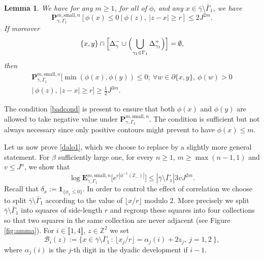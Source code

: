 \documentclass[JEP,XML,SOM,Unicode, NoFloatCountersInSection]{cedram}
\let\mathcal\mathscr
\newcommand{\sep}{\,:\,}
\numberwithin{equation}{section}
\theoremstyle{plain}
\newtheorem{lemma}[theorem]{Lemma}
\theoremstyle{definition}
\newcommand{\sm}{\mathrm{small}}
\newcommand{\lint}{\llbracket}
\newcommand{\rint}{\rrbracket}
\newcommand{\ind}{\mathbf{1}}
\newcommand{\cB}{{\ensuremath{\mathcal B}} }
\newcommand{\bP}{{\ensuremath{\mathbf P}} }
\newcommand{\bE}{{\ensuremath{\mathbf E}} }
\newcommand{\bbZ}{{\ensuremath{\mathbb Z}} }
\newcommand{\gb}{\beta}
\newcommand{\gG}{\Gamma}
\begin{document}
\begin{lemma}\label{locall}
We have for any $m\ge 1$, for all of $\phi$, and any $x\in\bar \gamma \setminus \bar \gG_1$, we have\vspace*{-3pt}
\begin{equation*}%
\bP^{m,\sm,n}_{\gamma,\gG_1}[\phi(x)\le 0\ | \ \phi(z),\ |z-x|\ge r]\le 2 J^{2m}.
\end{equation*}
If moreover\vspace*{-3pt}
\begin{equation}\label{badcond}
\{x,y\}\cap \Bigl[\Delta^-_{\gamma}\cup \Bigl(\bigcup_{\gamma_1\in \gG_1} \Delta^+_{\gamma_1}\Bigr) \Bigr]=\emptyset,\vspace*{-3pt}
\end{equation}
then\vspace*{-3pt}
\begin{multline*}%
\bP^{m,\sm,n}_{\gamma,\gG_1}\big[\min(\phi(x),\phi(y))\le 0; \ \forall w\in \partial \{x,y\}, \ \phi(w)>0 \\[-3pt]
| \ \phi(z),\ |z-x|\ge r\big]\ge \frac{1}{2} J^{3m}.
\end{multline*}
\end{lemma}
The condition \eqref{badcond} is present to ensure that both $\phi(x)$ and $\phi(y)$ are allowed to take negative value under
$\bP^{m,\sm,n}_{\gamma,\gG_1}$. The condition is sufficient but not always necessary since only positive contours might prevent to have $\phi(x)\le m$.

Let us now prove \eqref{dalo1}, which we choose to replace by a slightly more general statement. For $\gb$ sufficiently large one, for every $n\ge 1$,
$m\ge \max(n-1,1)$ and $v\le J^n$, we show that%
\begin{equation}\label{lecarlat}
\log \bE^{m,\sm,n}_{\gamma,\gG_1}\bigl[ e^{v |\phi^{-1}(\bbZ_-)|} \bigr] \le |\bar \gamma\setminus \bar \gG_1|3 v J^{2m}.
\end{equation}
Recall that $\delta_x:=\ind_{\{\phi_x\le 0\}}$.
In order to control the effect of correlation we choose to split $\bar \gamma \setminus \bar \gG_1$
according to the value of $\lfloor x/r \rfloor$ modulo $2$.
More precisely we split $\bar \gamma \setminus \bar \gG_1$ into squares of side-length $r$ and regroup these squares into four collections so that two squares in the same collection are never adjacent (see Figure \ref{fig:amma}).
For $i \in \lint 1, 4\rint$, $z\in\bbZ^2$ we set
\begin{equation}
\label{ztook}
\cB_i(z):=\{ x\in \bar \gamma \setminus \bar \gG_1 \sep \lfloor x_j/r \rfloor=\alpha_j(i)+2z_j,\ j=1,2\ \},
\end{equation}
where $\alpha_j(i)$ is the $j$-th digit in the dyadic development if $i-1$.
\end{document}
